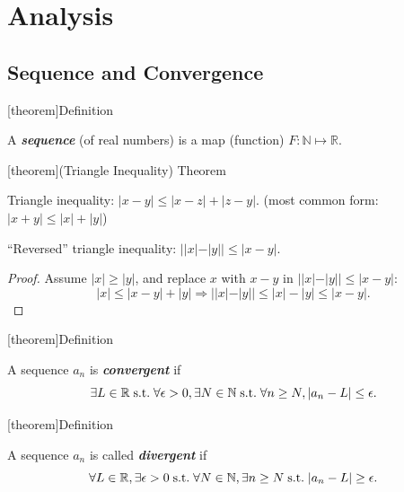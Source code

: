 \documentclass[12pt]{report}
\theoremstyle{definition}
\begin{document}




\chapter{Analysis}

\section{Sequence and Convergence}

[theorem]{Definition}
\begin{sequence}
    A \textbf{\emph{sequence}} (of real numbers) is a map (function) $F: \mathbb{N} \mapsto \mathbb{R}$.
\end{sequence}

[theorem]{(Triangle Inequality) Theorem}
\begin{triangle inequality}
    Triangle inequality: $|x-y| \le |x-z| + |z-y|$. (most common form: $|x+y| \le |x| + |y|$)

    ``Reversed'' triangle inequality: $||x|-|y|| \le |x-y|$.
\end{triangle inequality}

\begin{proof}
    Assume $|x| \ge |y|$, and replace $x$ with $x - y$ in $||x|-|y|| \le |x-y|$:\[
        |x| \le |x-y|+|y| \Rightarrow{}||x|-|y|| \le |x|-|y| \le |x-y|.
    \]
\end{proof}

[theorem]{Definition}
\begin{convergent sequences}
    A sequence $a_n$ is \textbf{\emph{convergent}} if \[
        \exists L \in \mathbb{R} \;\textnormal{s.t.}\; \forall \epsilon > 0,
        \exists N \in \mathbb{N} \;\textnormal{s.t.}\; \forall n \ge N, |a_n - L| \le \epsilon.
    \]
\end{convergent sequences}

[theorem]{Definition}
\begin{divergent sequences}
    A sequence $a_n$ is called \textbf{\emph{divergent}} if\[
        \forall L \in \mathbb{R}, \exists \epsilon > 0 \;\textnormal{s.t.}\;
        \forall N \in \mathbb{N}, \exists n \ge N \;\textnormal{s.t.}\; |a_n - L| \ge \epsilon.
    \]
\end{divergent sequences}
\end{document}
